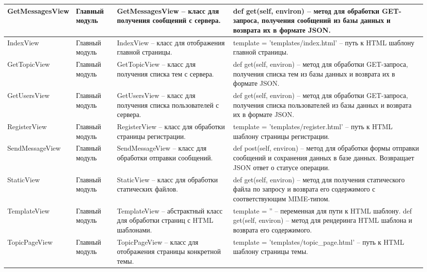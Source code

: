\begin{xltabular}{\textwidth}{|X|p{2.5cm}|>{\setlength{\baselineskip}{0.7\baselineskip}}p{4.85cm}|>{\setlength{\baselineskip}{0.7\baselineskip}}p{4.85cm}|}
\hline GetMessagesView & Главный модуль & GetMessagesView – класс для получения сообщений с сервера. & def get(self, environ) – метод для обработки GET-запроса, получения сообщений из базы данных и возврата их в формате JSON.  \\

\hline IndexView & Главный модуль & IndexView – класс для отображения главной страницы. & template = 'templates/index.html' – путь к HTML шаблону главной страницы.  \\

\hline GetTopicView & Главный модуль & GetTopicView – класс для получения списка тем с сервера. & def get(self, environ) – метод для обработки GET-запроса, получения списка тем из базы данных и возврата их в формате JSON.  \\

\hline GetUsersView & Главный модуль & GetUsersView – класс для получения списка пользователей с сервера. & def get(self, environ) – метод для обработки GET-запроса, получения списка пользователей из базы данных и возврата их в формате JSON.  \\


\hline RegisterView & Главный модуль & RegisterView – класс для обработки страницы регистрации. & template = 'templates/register.html' – путь к HTML шаблону страницы регистрации. \\

\hline SendMessageView & Главный модуль & SendMessageView – класс для обработки отправки сообщений. & def post(self, environ) – метод для обработки формы отправки сообщений и сохранения данных в базе данных. Возвращает JSON ответ о статусе операции.   \\

\hline StaticView & Главный модуль & StaticView – класс для обработки статических файлов. & def get(self, environ) – метод для получения статического файла по запросу и возврата его содержимого с соответствующим MIME-типом.   \\

\hline TemplateView & Главный модуль & TemplateView – абстрактный класс для обработки страниц с HTML шаблонами. & template = '' – переменная для пути к HTML шаблону. def get(self, environ) – метод для рендеринга HTML шаблона и возврата его содержимого.   \\


\hline TopicPageView & Главный модуль & TopicPageView – класс для отображения страницы конкретной темы. & template = 'templates/topic_page.html' – путь к HTML шаблону страницы темы. \\




\end{xltabular}
